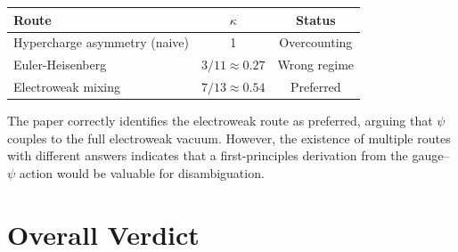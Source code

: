 \documentclass[aps,prd,twocolumn,superscriptaddress,nofootinbib]{revtex4-2}
\begin{document}
\begin{center}
\begin{tabular}{lcc}
\toprule
\textbf{Route} & $\kappa$ & \textbf{Status} \\
\midrule
Hypercharge asymmetry (naive) & 1 & Overcounting \\
Euler-Heisenberg & $3/11 \approx 0.27$ & Wrong regime \\
Electroweak mixing & $7/13 \approx 0.54$ & Preferred \\
\bottomrule
\end{tabular}
\end{center}

The paper correctly identifies the electroweak route as preferred,
arguing that $\psi$ couples to the full electroweak vacuum.
However, the existence of multiple routes with different answers
indicates that a first-principles derivation from the
gauge--$\psi$ action would be valuable for disambiguation.


\section{Overall Verdict}
\label{sec:verdict}
\end{document}
